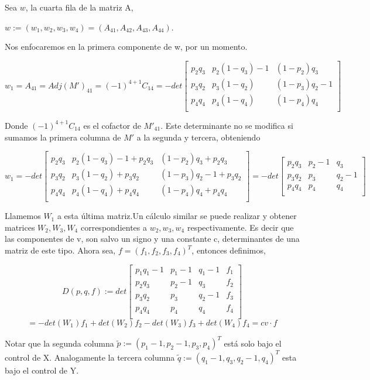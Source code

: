 \documentclass[11pt]{article}
\begin{document}
Sea $w$, la cuarta fila de la matriz A, 
\begin{center}
$w:=(w_1,w_2,w_3,w_4)=(A_{41},A_{42},A_{43},A_{44})$.
\end{center}
Nos enfocaremos en la primera componente de w, por un momento.
\begin{center}
 $$
 w_1=A_{41}=Adj(M')_{41}=(-1)^{4+1} C_{14}=- det
 \begin{bmatrix}
 p_2 q_3 & p_2(1-q_3)-1 &(1-p_2)q_3 \\
 p_3 q_2 & p_3(1-q_2) &(1-p_3)q_2 -1 \\ 
 p_4 q_4 & p_4(1-q_4) &(1-p_4)q_4 \\ 
 \end{bmatrix}
 $$
 \end{center}
 Donde $(-1)^{4+1} C_{14}$ es el cofactor de $M'_{41}$. Este determinante no se modifica si sumamos la 
 primera columna de $M'$ a la segunda y tercera, obteniendo
 \begin{center}
 $w_1=- det
 \begin{bmatrix}
 p_2q_3 & p_2(1-q_3)-1+p_2q_3 &(1-p_2)q_3+p_2q_3 \\
 p_3q_2 & p_3(1-q_2)+p_3q_2 &(1-p_3)q_2 -1+p_3q_2 \\ 
 p_4q_4 & p_4(1-q_4)+p_4q_4 &(1-p_4)q_4+p_4q_4 \\ 
 \end{bmatrix}
  =- det
 \begin{bmatrix}
 p_2q_3 & p_2-1 & q_3 \\
 p_3q_2 & p_3 & q_2-1 \\ 
 p_4q_4 & p_4 & q_4 \\ 
 \end{bmatrix} 
 $
\end{center} 
Llamemos $W_1$ a esta última matriz.Un cálculo similar se puede realizar y obtener matrices $W_2,W_3,W_4$ 
correspondientes a $w_2,w_3,w_4$ respectivamente. Es decir que las componentes de v, son salvo un signo y una constante c, 
determinantes de una matriz de este tipo.
Ahora sea, $f=(f_1,f_2,f_3,f_4)^T$, entonces definimos,
\begin{center}
$$
D(p,q,f):=det
\begin{bmatrix}
 p_1q_1-1 & p_1-1 & q_1-1 & f_1 \\
 p_2q_3 & p_2-1 & q_3 & f_2\\
 p_3q_2 & p_3 & q_2-1  & f_3\\ 
 p_4q_4 & p_4 & q_4 & f_4\\ 
 \end{bmatrix} 
 $$
 $$
 =-det(W_1)f_1 +det(W_2)f_2 -det(W_3)f_3 +det(W_4)f_4 
 = c v \cdot f
 $$
\end{center}
Notar que la segunda columna $\tilde{p}:= (p_1-1,p_2-1,p_3,p_4)^T$ está solo bajo el control de X.
Analogamente la tercera columna $\tilde{q}:=(q_1-1,q_3,q_2-1,q_4)^T$ esta bajo el control de Y.\newline
\end{document}

